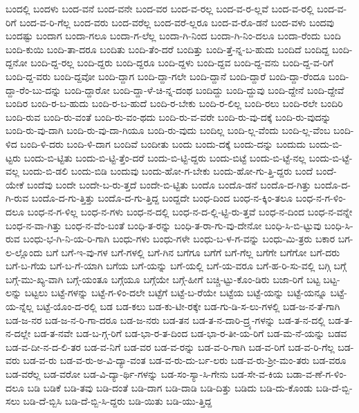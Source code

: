 {ಬಂದಲ್ಲಿ
ಬಂದಳು
ಬಂದ-ವನೆ
ಬಂದ-ವನೇ
ಬಂದ-ವರ
ಬಂದ-ವ-ರಲ್ಲ
ಬಂದ-ವ-ರ-ಲ್ಲವೆ
ಬಂದ-ವ-ರಲ್ಲಿ
ಬಂದ-ವ-ರಿಗೆ
ಬಂದ-ವ-ರಿ-ಗೆಲ್ಲ
ಬಂದ-ವರು
ಬಂದ-ವರೆಲ್ಲ
ಬಂದ-ವರೆ-ಲ್ಲರೂ
ಬಂದ-ವ-ರೊ-ಡನೆ
ಬಂದ-ವಳು
ಬಂದವು
ಬಂದಷ್ಟು
ಬಂದಾಗ
ಬಂದಾ-ಗಲೂ
ಬಂದಾ-ಗ-ಲೆಲ್ಲ
ಬಂದಾ-ಗಿ-ನಿಂದ
ಬಂದಾ-ಗಿ-ನಿಂ-ದಲೂ
ಬಂದಾ-ರೆಂದು
ಬಂದಿ
ಬಂದಿ-ಕುಯಿ
ಬಂದಿ-ತಾ-ದರೂ
ಬಂದಿತು
ಬಂದಿ-ತೆಂ-ದರೆ
ಬಂದಿತ್ತು
ಬಂದಿ-ತ್ತೆ-ನ್ನ-ಬ-ಹುದು
ಬಂದಿದೆ
ಬಂದಿದ್ದ
ಬಂದಿ-ದ್ದನೋ
ಬಂದಿ-ದ್ದ-ರಲ್ಲ
ಬಂದಿ-ದ್ದರು
ಬಂದಿ-ದ್ದರೂ
ಬಂದಿ-ದ್ದಳು
ಬಂದಿ-ದ್ದವ
ಬಂದಿ-ದ್ದ-ವನು
ಬಂದಿ-ದ್ದ-ವ-ರಿಗೆ
ಬಂದಿ-ದ್ದ-ವರು
ಬಂದಿ-ದ್ದವೋ
ಬಂದಿ-ದ್ದಾಗ
ಬಂದಿ-ದ್ದಾ-ಗಲೇ
ಬಂದಿ-ದ್ದಾನೆ
ಬಂದಿ-ದ್ದಾರೆ
ಬಂದಿ-ದ್ದಾ-ರೆಂದೂ
ಬಂದಿ-ದ್ದಾ-ರೆಂ-ಬು-ದನ್ನು
ಬಂದಿ-ದ್ದಾರೋ
ಬಂದಿ-ದ್ದಾ-ಳೆ-ಚಿ-ನ್ನ-ದಂಥ
ಬಂದಿದ್ದು
ಬಂದಿ-ದ್ದುವು
ಬಂದಿ-ದ್ದೇನೆ
ಬಂದಿ-ದ್ದೇವೆ
ಬಂದಿರ
ಬಂದಿ-ರ-ಬ-ಹುದು
ಬಂದಿ-ರ-ಬ-ಹುದೆ
ಬಂದಿ-ರ-ಬೇಕು
ಬಂದಿ-ರ-ಲಿಲ್ಲ
ಬಂದಿ-ರಲು
ಬಂದಿ-ರಲೇ
ಬಂದಿರಿ
ಬಂದಿ-ರುವ
ಬಂದಿ-ರು-ವಂತೆ
ಬಂದಿ-ರು-ವಂ-ಥದು
ಬಂದಿ-ರು-ವ-ವರೇ
ಬಂದಿ-ರು-ವು-ದಕ್ಕೆ
ಬಂದಿ-ರು-ವುದನ್ನು
ಬಂದಿ-ರು-ವು-ದಾಗಿ
ಬಂದಿ-ರು-ವು-ದಾ-ಗಿಯೂ
ಬಂದಿ-ರು-ವುದು
ಬಂದಿಲ್ಲ
ಬಂದಿ-ಲ್ಲ-ವೆಂದು
ಬಂದಿ-ಲ್ಲ-ವೆಂಬ
ಬಂದಿ-ಳಿದ
ಬಂದಿ-ಳಿ-ದರು
ಬಂದಿ-ಳಿ-ದಾಗ
ಬಂದಿವೆ
ಬಂದೀತು
ಬಂದು
ಬಂದು-ದಕ್ಕೆ
ಬಂದು-ದನ್ನು
ಬಂದುದು
ಬಂದು-ಬಿ-ಟ್ಟರು
ಬಂದು-ಬಿ-ಟ್ಟಿತು
ಬಂದು-ಬಿ-ಟ್ಟಿ-ತ್ತೆಂ-ದರೆ
ಬಂದು-ಬಿ-ಟ್ಟಿ-ದ್ದರು
ಬಂದು-ಬಿಟ್ಟೆ
ಬಂದು-ಬಿ-ಟ್ಟೆ-ನಲ್ಲ
ಬಂದು-ಬಿ-ಟ್ಟೆ-ವಲ್ಲ
ಬಂದು-ಬಿ-ಡಲಿ
ಬಂದು-ಬಿಡಿ
ಬಂದುವು
ಬಂದು-ಹೋ-ಗ-ಬೇಕು
ಬಂದು-ಹೋ-ಗು-ತ್ತಿ-ದ್ದರು
ಬಂದೆ
ಬಂದೆ-ಯೇಕೆ
ಬಂದೆವು
ಬಂದೇ
ಬಂದೇ-ಬ-ರು-ತ್ತದೆ
ಬಂದೇ-ಬಿ-ಟ್ಟಿತು
ಬಂದೊ
ಬಂದೊ-ಡನೆ
ಬಂದೊ-ದ-ಗಿತ್ತು
ಬಂದೊ-ದ-ಗಿ-ರುವ
ಬಂದೊ-ದ-ಗು-ತ್ತಿತ್ತು
ಬಂದೊ-ದ-ಗು-ತ್ತಿದ್ದ
ಬಂದ್ದದೇ
ಬಂಧ-ದಿಂದ
ಬಂಧ-ನ-ಕ್ಕಿಂ-ತಲೂ
ಬಂಧ-ನ-ಗ-ಳಿಂ-ದಲೂ
ಬಂಧ-ನ-ಗ-ಳಿಲ್ಲ
ಬಂಧ-ನ-ಗಳು
ಬಂಧ-ನ-ದಲ್ಲಿ
ಬಂಧ-ನ-ದ-ಲ್ಲಿ-ಟ್ಟಿ-ರು-ತ್ತವೆ
ಬಂಧ-ನ-ದಿಂದ
ಬಂಧ-ನ-ವನ್ನೇ
ಬಂಧ-ನ-ವಾ-ಗಿತ್ತು
ಬಂಧ-ನ-ವೆಂ-ಬಂತೆ
ಬಂಧಿ-ತ-ರನ್ನು
ಬಂಧಿ-ತ-ರಾ-ಗು-ವು-ದೇನೋ
ಬಂಧಿ-ಸಿ-ಬಿ-ಟ್ಟುವು
ಬಂಧಿ-ಸಿ-ರುವ
ಬಂಧು-ಭ-ಗಿ-ನಿ-ಯ-ರಿ-ಗಾಗಿ
ಬಂಧು-ಗಳು
ಬಂಧು-ಗಳೇ
ಬಂಧು-ಬ-ಳ-ಗ-ವನ್ನು
ಬಂಧು-ಮಿ-ತ್ರರು
ಬಕಾರ
ಬಗ-ಲ-ಲ್ಲೊಂದು
ಬಗೆ
ಬಗೆ-ಇ-ವು-ಗಳ
ಬಗೆ-ಗಳಲ್ಲಿ
ಬಗೆ-ಗಿನ
ಬಗೆಗೂ
ಬಗೆಗೆ
ಬಗೆ-ಗೆಲ್ಲ
ಬಗೆಗೇ
ಬಗೆಗೋ
ಬಗೆ-ದರು
ಬಗೆ-ಬ-ಗೆಯ
ಬಗೆ-ಬ-ಗೆ-ಯಾಗಿ
ಬಗೆಯ
ಬಗೆ-ಯನ್ನು
ಬಗೆ-ಯಲ್ಲಿ
ಬಗೆ-ಯ-ವರೂ
ಬಗೆ-ಹ-ರಿ-ಸು-ವಲ್ಲಿ
ಬಗ್ಗಿ
ಬಗ್ಗೆ
ಬಗ್ಗೆ-ಮು-ಖ್ಯ-ವಾಗಿ
ಬಗ್ಗೆ-ಯಂತೂ
ಬಗ್ಗೆಯೂ
ಬಗ್ಗೆಯೇ
ಬಗ್ಗೆ-ಹೀಗೆ
ಬಚ್ಚಿ-ಟ್ಟು-ಕೊಂ-ಡಿರು
ಬಜಾ-ರಿಗೆ
ಬಟ್ಟ
ಬಟ್ಟ-ಲನ್ನು
ಬಟ್ಟಲು
ಬಟ್ಟೆ-ಗಳನ್ನು
ಬಟ್ಟೆ-ಗ-ಳಿಂ-ದಲೇ
ಬಟ್ಟೆಗೆ
ಬಟ್ಟೆ-ಬ-ರೆಯೇ
ಬಟ್ಟೆಯ
ಬಟ್ಟೆ-ಯನ್ನು
ಬಟ್ಟೆ-ಯನ್ನೂ
ಬಟ್ಟೆ-ಯ-ನ್ನೆಲ್ಲ
ಬಟ್ಟೆ-ಯೊಂ-ದ-ರಲ್ಲಿ
ಬಡ
ಬಡ-ಕಲು
ಬಡ-ಕು-ಟೀ-ರಕ್ಕೇ
ಬಡ-ಗು-ಡಿ-ಸ-ಲು-ಗಳಲ್ಲಿ
ಬಡ-ಜ-ನ-ತೆ-ಗಾಗಿ
ಬಡ-ಜ-ನರ
ಬಡ-ಜ-ನ-ರಿ-ಗಾ-ದರೂ
ಬಡ-ಜ-ನರು
ಬಡ-ತನ
ಬಡ-ತ-ನ-ದಾರಿ-ದ್ರ್ಯ-ಗಳನ್ನು
ಬಡ-ತ-ನ-ದಲ್ಲಿ
ಬಡ-ತ-ನ-ದಲ್ಲೇ
ಬಡ-ತ-ನವೇ
ಬಡ-ಬ-ಗ್ಗ-ರಿಗೆ
ಬಡ-ಭಾ-ರ-ತ-ದಿಂದ
ಬಡ-ಭಾ-ರ-ತೀ-ಯ-ರಿಗೆ
ಬಡ-ಮ-ನೆ-ಯನ್ನು
ಬಡವ
ಬಡ-ವ-ದೀ-ನ-ದ-ಲಿ-ತರ
ಬಡ-ವ-ನಿಗೆ
ಬಡ-ವರ
ಬಡ-ವ-ರನ್ನು
ಬಡ-ವ-ರಿ-ಗಾಗಿ
ಬಡ-ವ-ರಿಗೆ
ಬಡ-ವ-ರಿ-ಗೆಲ್ಲ
ಬಡ-ವರು
ಬಡ-ವ-ರು
ಬಡ-ವ-ರು-ಅ-ವಿ-ದ್ಯಾ-ವಂತ
ಬಡ-ವ-ರು-ದು-ರ್ಬ-ಲರು
ಬಡ-ವ-ರು-ಶ್ರೀ-ಮಂ-ತರು
ಬಡ-ವರೂ
ಬಡ-ವರೆಲ್ಲ
ಬಡ-ವರೋ
ಬಡ-ವಿ-ದ್ಯಾ-ರ್ಥಿ-ಗಳನ್ನು
ಬಡ-ಸಂ-ಸ್ಯಾ-ಸಿ-ಗೇನು
ಬಡ-ಸೇ-ವ-ಕಿಯ
ಬಡಾ-ವ-ಣೆ-ಗ-ಳಿಂ-ದಲೂ
ಬಡಿ
ಬಡಿಕೆ
ಬಡಿ-ತವು
ಬಡಿ-ದಂತೆ
ಬಡಿ-ದಾಗ
ಬಡಿ-ದಾಡಿ
ಬಡಿ-ದಿತ್ತು
ಬಡಿದು
ಬಡಿ-ದು-ಕೊಂಡು
ಬಡಿ-ದೆ-ಬ್ಬಿ-ಸಲು
ಬಡಿ-ದೆ-ಬ್ಬಿಸಿ
ಬಡಿ-ದೆ-ಬ್ಬಿ-ಸಿ-ದ್ದರು
ಬಡಿ-ಯಿತು
ಬಡಿ-ಯು-ತ್ತಿದ್ದ
}
